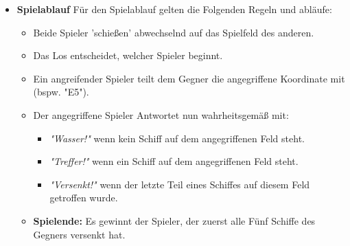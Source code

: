 \begin{itemize}
	\item \textbf{Spielablauf} \newline Für den Spielablauf gelten die Folgenden Regeln und abläufe:
		\begin{itemize}
			\item Beide Spieler 'schießen' abwechselnd auf das Spielfeld des anderen.
			\item Das Los entscheidet, welcher Spieler beginnt.
			\item Ein angreifender Spieler teilt dem Gegner die angegriffene Koordinate mit (bspw. "E5").
			\item Der angegriffene Spieler Antwortet nun wahrheitsgemäß mit:
				\begin{itemize}
					\item \emph{"Wasser!"} wenn kein Schiff auf dem angegriffenen Feld steht.
					\item \emph{"Treffer!"} wenn ein Schiff auf dem angegriffenen Feld steht.
					\item \emph{"Versenkt!"} wenn der letzte Teil eines Schiffes auf diesem Feld getroffen wurde.
				\end{itemize}
			\item \textbf{Spielende:} Es gewinnt der Spieler, der zuerst alle Fünf Schiffe des Gegners versenkt hat.
		\end{itemize}
\end{itemize}